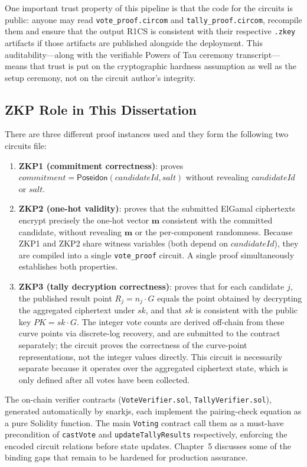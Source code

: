 One important trust property of this pipeline is that the code for the circuits is public: anyone may read \texttt{vote\_proof.circom} and \texttt{tally\_proof.circom}, recompile them and ensure that the output R1CS is consistent with their respective \texttt{.zkey} artifacts if those artifacts are published alongside the deployment. This auditability---along with the verifiable Powers of Tau ceremony transcript---means that trust is put on the cryptographic hardness assumption as well as the setup ceremony, not on the circuit author's integrity.

\subsection{ZKP Role in This Dissertation}

There are three different proof instances used and they form the following two circuits file:
\begin{enumerate}
    \item \textbf{ZKP1 (commitment correctness)}: proves $\mathit{commitment} = \mathsf{Poseidon}(\mathit{candidateId}, \mathit{salt})$ without revealing $\mathit{candidateId}$ or $\mathit{salt}$.
    \item \textbf{ZKP2 (one-hot validity)}: proves that the submitted ElGamal ciphertexts encrypt precisely the one-hot vector $\mathbf{m}$ consistent with the committed candidate, without revealing $\mathbf{m}$ or the per-component randomness. Because ZKP1 and ZKP2 share witness variables (both depend on $\mathit{candidateId}$), they are compiled into a single \texttt{vote\_proof} circuit. A single proof simultaneously establishes both properties.
    \item \textbf{ZKP3 (tally decryption correctness)}: proves that for each candidate $j$, the published result point $R_j = n_j \cdot G$ equals the point obtained by decrypting the aggregated ciphertext under $\mathit{sk}$, and that $\mathit{sk}$ is consistent with the public key $\mathit{PK} = \mathit{sk} \cdot G$. The integer vote counts are derived off-chain from these curve points via discrete-log recovery, and are submitted to the contract separately; the circuit proves the correctness of the curve-point representations, not the integer values directly. This circuit is necessarily separate because it operates over the aggregated ciphertext state, which is only defined after all votes have been collected.
\end{enumerate}

The on-chain verifier contracts (\texttt{VoteVerifier.sol}, \texttt{TallyVerifier.sol}), generated automatically by snarkjs, each implement the pairing-check equation as a pure Solidity function. The main \texttt{Voting} contract call them as a must-have precondition of \texttt{castVote} and \texttt{updateTallyResults} respectively, enforcing the encoded circuit relations before state updates. Chapter~5 discusses some of the binding gaps that remain to be hardened for production assurance.

